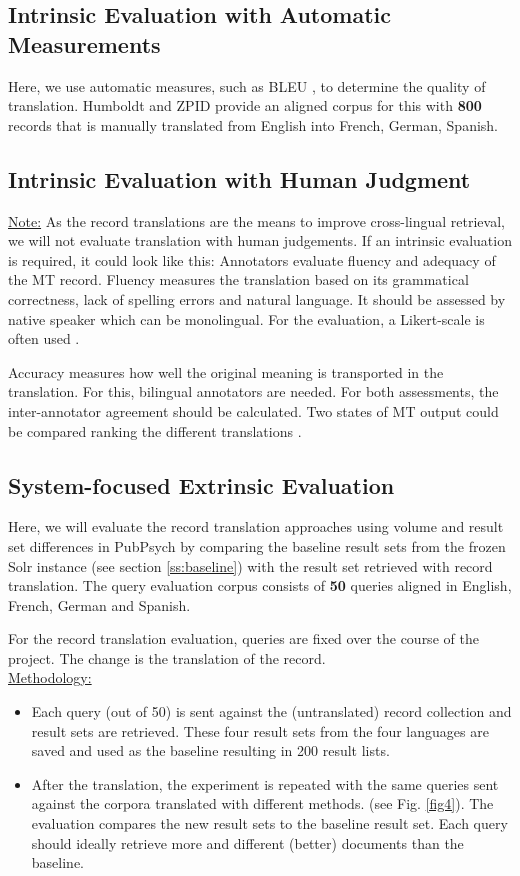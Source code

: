 \documentclass[a4paper,11pt]{article}
\begin{document}
\subsection{Intrinsic Evaluation with Automatic Measurements}
Here, we use automatic measures, such as BLEU \cite{papineni_bleu:_2002}, to determine the quality of translation. Humboldt and ZPID provide an aligned corpus for this with \textbf{800} records that is manually translated from English into French, German, Spanish. 

\subsection{Intrinsic Evaluation with Human Judgment}
\underline{Note:} As the record translations are the means to improve cross-lingual retrieval, we will not evaluate translation with human judgements. If an intrinsic evaluation is required, it could look like this:
Annotators evaluate fluency and adequacy of the MT record. Fluency measures the translation based on its grammatical correctness, lack of spelling errors and natural language. It should be assessed by native speaker which can be monolingual. For the evaluation, a Likert-scale is often used \cite[Ch. 4]{chen_multilingual_2016}.

Accuracy measures how well the original meaning is transported in the translation. For this, bilingual annotators are needed. For both assessments, the inter-annotator agreement should be calculated.
Two states of MT output could be compared ranking the different translations \cite{Vilar:2007}.

\subsection{System-focused Extrinsic Evaluation}
Here, we will evaluate the record translation approaches using volume and result set differences in PubPsych by comparing the baseline result sets from the frozen Solr instance (see section \ref{ss:baseline}) with the result set retrieved with record translation. 
The query evaluation corpus consists of \textbf{50} queries aligned in English, French, German and Spanish. 

For the record translation evaluation, queries are fixed over the course of the project. The change is the translation of the record.\\

\underline{Methodology:}
\begin{itemize}
\item Each query (out of 50) is sent against the (untranslated) record collection and result sets are retrieved. These four result sets from the four languages are saved and used as the baseline resulting in 200 result lists.

\item After the translation, the experiment is repeated with the same queries sent against the corpora translated with different methods. (see Fig. \ref{fig4}). The evaluation compares the new result sets to the baseline result set. Each query should ideally retrieve more and different (better) documents than the baseline. 
\end{itemize}
\end{document}
